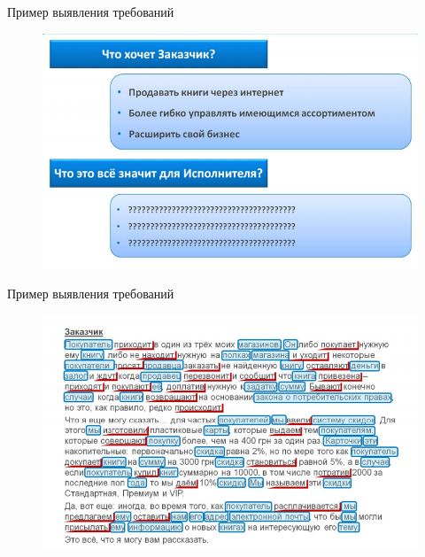 \documentclass{beamer}
\begin{document}
\begin{frame}[t]{Пример выявления требований}
\begin{figure}[h]
\centering
\includegraphics[scale=0.5]{images/lec02-pic10.png}
\end{figure}
\end{frame}

\begin{frame}[t]{Пример выявления требований}
\begin{figure}[h]
\centering
\includegraphics[scale=0.5]{images/lec02-pic11.png}
\end{figure}
\end{frame}
\end{document}
